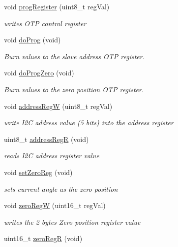 \begin{DoxyCompactItemize}
void \hyperlink{classAMS__AS5048B_a6ff8070d7845ce5ef325a6c64ea29c96}{prog\+Register} (uint8\+\_\+t reg\+Val)
\begin{DoxyCompactList}\small\item\em writes O\+TP control register \end{DoxyCompactList}\item 
void \hyperlink{classAMS__AS5048B_a9acf55772619d8df888be48c8a31eef8}{do\+Prog} (void)
\begin{DoxyCompactList}\small\item\em Burn values to the slave address O\+TP register. \end{DoxyCompactList}\item 
void \hyperlink{classAMS__AS5048B_a69012e91b30cd4182f072a7d2f377305}{do\+Prog\+Zero} (void)
\begin{DoxyCompactList}\small\item\em Burn values to the zero position O\+TP register. \end{DoxyCompactList}\item 
void \hyperlink{classAMS__AS5048B_a8faebc24296fd8ac9464f5b5aab0d1d1}{address\+RegW} (uint8\+\_\+t reg\+Val)
\begin{DoxyCompactList}\small\item\em write I2C address value (5 bits) into the address register \end{DoxyCompactList}\item 
uint8\+\_\+t \hyperlink{classAMS__AS5048B_a02b3c3054c8cca8c3d8167b835794ff6}{address\+RegR} (void)
\begin{DoxyCompactList}\small\item\em reads I2C address register value \end{DoxyCompactList}\item 
void \hyperlink{classAMS__AS5048B_ad67ba3de9224a12102a31b35829450e8}{set\+Zero\+Reg} (void)
\begin{DoxyCompactList}\small\item\em sets current angle as the zero position \end{DoxyCompactList}\item 
void \hyperlink{classAMS__AS5048B_a67cbd882f0300705d615ce1e2dff2f47}{zero\+RegW} (uint16\+\_\+t reg\+Val)
\begin{DoxyCompactList}\small\item\em writes the 2 bytes Zero position register value \end{DoxyCompactList}\item 
uint16\+\_\+t \hyperlink{classAMS__AS5048B_a7784bc5f991bb485c2731a7189d277bf}{zero\+RegR} (void)

\end{DoxyCompactItemize}
